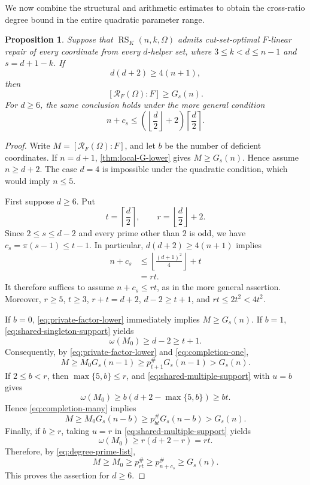 \documentclass[11pt,onecolumn]{IEEEtran}
\newtheorem{proposition}{Proposition}
\newcommand{\RS}{\operatorname{RS}}
\newcommand{\crf}{\mathscr R}
\newcommand{\primorial}[1]{p_{#1}^{\#}}
\begin{document}
We now combine the structural and arithmetic estimates to obtain the
cross-ratio degree bound in the entire quadratic parameter range.

\begin{proposition}
\label{prop:quadratic-degree-system}
Suppose that $\RS_K(n,k,\Omega)$ admits cut-set-optimal $F$-linear
repair of every coordinate from every $d$-helper set, where
$3\le k<d\le n-1$ and $s=d+1-k$. If
\[
d(d+2)\geq 4(n+1),
\]
then
\[
[\crf_F(\Omega):F]\ge G_s(n).
\]
For $d\ge6$, the same conclusion holds under the more general condition
\[
n+c_s\le
\left(\left\lfloor\frac d2\right\rfloor+2\right)
\left\lceil\frac d2\right\rceil.
\]
\end{proposition}

\begin{proof}
Write $M=[\crf_F(\Omega):F]$, and let $b$ be the number of deficient
coordinates. If $n=d+1$, \cref{thm:local-G-lower} gives
$M\ge G_s(n)$. Hence assume $n\ge d+2$.
The case $d=4$ is impossible under the quadratic condition,
which would imply $n\le5$.

First suppose $d\ge6$. Put
\[
t=\left\lceil\frac d2\right\rceil,\qquad
r=\left\lfloor\frac d2\right\rfloor+2.
\]
Since $2\le s\le d-2$ and every prime other than $2$
is odd, we have $c_s=\pi(s-1)\le t-1$. In particular,
$d(d+2)\geq 4(n+1)$ implies
\[
\begin{aligned}
n+c_s
&\le\left\lfloor\frac{(d+1)^2}{4}\right\rfloor+t\\
&=rt.
\end{aligned}
\]
It therefore suffices to assume $n+c_s\le rt$, as in the
more general assertion. Moreover, $r\ge5$, $t\ge3$, $r+t=d+2$, $d-2\ge t+1$,
and $rt\le2t^2<4t^2$.

If $b=0$, \eqref{eq:private-factor-lower} immediately implies
$M\ge G_s(n)$. If $b=1$, \eqref{eq:shared-singleton-support}
yields
\[
\omega(M_0)\ge d-2\ge t+1.
\]
Consequently, by \eqref{eq:private-factor-lower} and
\eqref{eq:completion-one},
\[
M\ge M_0G_s(n-1)
\ge\primorial{t+1}G_s(n-1)>G_s(n).
\]
If $2\le b<r$, then $\max\{5,b\}\le r$, and
\eqref{eq:shared-multiple-support} with $u=b$ gives
\[
\omega(M_0)
\ge b(d+2-\max\{5,b\})\ge bt.
\]
Hence \eqref{eq:completion-many} implies
\[
M\ge M_0G_s(n-b)
\ge\primorial{bt}G_s(n-b)>G_s(n).
\]
Finally, if $b\ge r$, taking $u=r$ in
\eqref{eq:shared-multiple-support} yields
\[
\omega(M_0)\ge r(d+2-r)=rt.
\]
Therefore, by \eqref{eq:degree-prime-list},
\[
M\ge M_0\ge\primorial{rt}
\ge\primorial{n+c_s}\ge G_s(n).
\]
This proves the assertion for $d\ge6$.


\end{proof}
\end{document}
